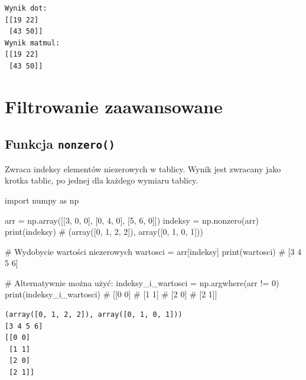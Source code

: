 \documentclass[
  polish,
  letterpaper,
  DIV=11,
  numbers=noendperiod]{scrreprt}
\newenvironment{Shaded}{\begin{snugshade}}{\end{snugshade}}
\newcommand{\BuiltInTok}[1]{\textcolor[rgb]{0.00,0.23,0.31}{#1}}
\newcommand{\CommentTok}[1]{\textcolor[rgb]{0.37,0.37,0.37}{#1}}
\newcommand{\DecValTok}[1]{\textcolor[rgb]{0.68,0.00,0.00}{#1}}
\newcommand{\ImportTok}[1]{\textcolor[rgb]{0.00,0.46,0.62}{#1}}
\newcommand{\NormalTok}[1]{\textcolor[rgb]{0.00,0.23,0.31}{#1}}
\newcommand{\OperatorTok}[1]{\textcolor[rgb]{0.37,0.37,0.37}{#1}}
\begin{document}
\begin{verbatim}
Wynik dot:
[[19 22]
 [43 50]]
Wynik matmul:
[[19 22]
 [43 50]]
\end{verbatim}

\chapter{Filtrowanie zaawansowane}\label{filtrowanie-zaawansowane}

\section{\texorpdfstring{Funkcja
\texttt{nonzero()}}{Funkcja nonzero()}}\label{funkcja-nonzero}

Zwraca indeksy elementów niezerowych w tablicy. Wynik jest zwracany jako
krotka tablic, po jednej dla każdego wymiaru tablicy.

\begin{Shaded}
\begin{Highlighting}[]
\ImportTok{import}\NormalTok{ numpy }\ImportTok{as}\NormalTok{ np}

\NormalTok{arr }\OperatorTok{=}\NormalTok{ np.array([[}\DecValTok{3}\NormalTok{, }\DecValTok{0}\NormalTok{, }\DecValTok{0}\NormalTok{], [}\DecValTok{0}\NormalTok{, }\DecValTok{4}\NormalTok{, }\DecValTok{0}\NormalTok{], [}\DecValTok{5}\NormalTok{, }\DecValTok{6}\NormalTok{, }\DecValTok{0}\NormalTok{]])}
\NormalTok{indeksy }\OperatorTok{=}\NormalTok{ np.nonzero(arr)}
\BuiltInTok{print}\NormalTok{(indeksy)  }\CommentTok{\# (array([0, 1, 2, 2]), array([0, 1, 0, 1]))}

\CommentTok{\# Wydobycie wartości niezerowych}
\NormalTok{wartosci }\OperatorTok{=}\NormalTok{ arr[indeksy]}
\BuiltInTok{print}\NormalTok{(wartosci)  }\CommentTok{\# [3 4 5 6]}

\CommentTok{\# Alternatywnie można użyć:}
\NormalTok{indeksy\_i\_wartosci }\OperatorTok{=}\NormalTok{ np.argwhere(arr }\OperatorTok{!=} \DecValTok{0}\NormalTok{)}
\BuiltInTok{print}\NormalTok{(indeksy\_i\_wartosci)  }
\CommentTok{\# [[0 0]}
\CommentTok{\#  [1 1]}
\CommentTok{\#  [2 0]}
\CommentTok{\#  [2 1]]}
\end{Highlighting}
\end{Shaded}

\begin{verbatim}
(array([0, 1, 2, 2]), array([0, 1, 0, 1]))
[3 4 5 6]
[[0 0]
 [1 1]
 [2 0]
 [2 1]]
\end{verbatim}
\end{document}

